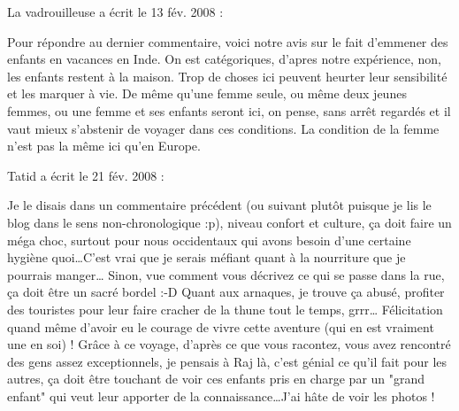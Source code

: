 \medskip
La vadrouilleuse a écrit le 13 fév. 2008 :
\begin{displayquote}
Pour répondre au dernier commentaire, voici notre avis sur le fait d'emmener des enfants en vacances en Inde. On est catégoriques, d'apres notre expérience, non, les enfants restent à la maison. Trop de choses ici peuvent heurter leur sensibilité et les marquer à vie.
De même qu'une femme seule, ou même deux jeunes femmes, ou une femme et ses enfants seront ici, on pense, sans arrêt regardés et il vaut mieux s'abstenir de voyager dans ces conditions. La condition de la femme n'est pas la même ici qu'en Europe.
\end{displayquote}

\medskip
Tatid a écrit le 21 fév. 2008 :
\begin{displayquote}
Je le disais dans un commentaire précédent (ou suivant plutôt puisque je lis le blog dans le sens non-chronologique :p), niveau confort et culture, ça doit faire un méga choc, surtout pour nous occidentaux qui avons besoin d'une certaine hygiène quoi\dots C'est vrai que je serais méfiant quant à la nourriture que je pourrais manger\dots
Sinon, vue comment vous décrivez ce qui se passe dans la rue, ça doit être un sacré bordel :-D Quant aux arnaques, je trouve ça abusé, profiter des touristes pour leur faire cracher de la thune tout le temps, grrr\dots
Félicitation quand même d'avoir eu le courage de vivre cette aventure (qui en est vraiment une en soi) !
Grâce à ce voyage, d'après ce que vous racontez, vous avez rencontré des gens assez exceptionnels, je pensais à Raj là, c'est génial ce qu'il fait pour les autres, ça doit être touchant de voir ces enfants pris en charge par un "grand enfant" qui veut leur apporter de la connaissance\dots J'ai hâte de voir les photos !
\end{displayquote}

\vfill
